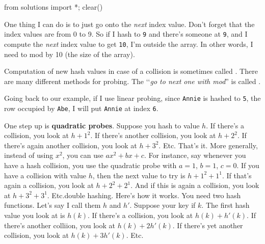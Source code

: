\begin{python0}
from solutions import *; clear()
\end{python0}

One thing I can do is to just go onto the \textit{next} index value.
Don't forget that the index values are from 0 to 9.
So if I hash to \verb!9! and there's someone at \verb!9!,
and I compute the \textit{next} index value to get \verb!10!,
I'm outside the array.
In other words, I need to mod by 10 (the size of the array).

Computation of new hash values in case of a collision is
sometimes called .
There are many different methods for probing.
The \lq\lq \textit{go to next one with mod}''
is called .

Going back to our example, if I use linear probing, since
\verb!Annie! is hashed to \verb!5!, the row occupied by \verb!Abe!,
I will put \verb!Annie! at index \verb!6!.



One step up is \textbf{quadratic probes}.
Suppose you hash to value $h$.
If there's a collision, you look at $h + 1^2$.
If there's another collision, you look at $h + 2^2$.
If there's again another collision, you look at $h + 3^2$.
Etc.
That's it.
More generally, instead of using $x^2$, you can 
use $ax^2 + bx + c$.
For instance, say whenever you have a hash collision,
you use
the quadratic probe with $a = 1$, $b = 1$, $c = 0$.
If you have a collision with value $h$, then
the next value to try is 
$h + 1^2 + 1^1$.
If that's again a collision, you look at 
$h + 2^2 + 2^1$.
And if this is again a collision, you look at
$h + 3^2 + 3^1$.
Etc.{double hashing}.
Here's how it works.
You need two hash functions.
Let's say I call them $h$ and $h'$.
Suppose your key if $k$.
The first hash value you look at is $h(k)$.
If there's a collision, you look at 
$h(k) + h'(k)$.
If there's another colliion, you look at
$h(k) + 2h'(k)$.
If there's yet another collision, you look at
$h(k) + 3h'(k)$.
Etc.














\newpage
